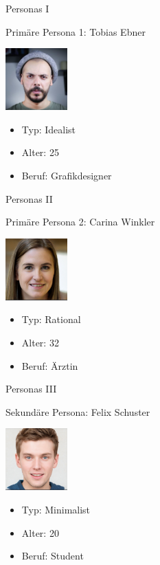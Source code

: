 \documentclass[presentation,bigger,aspectratio=169]{beamer}
\begin{document}
\begin{frame}[label={sec:org28a7227}]{Personas I}
\begin{block}{Primäre Persona 1: Tobias Ebner}
\begin{center}
\includegraphics[width=90px]{./img/m1_persona_1_idealist.png}
\end{center}
\begin{itemize}
\item Typ: Idealist
\item Alter: 25
\item Beruf: Grafikdesigner
\end{itemize}
\end{block}
\end{frame}
\begin{frame}[label={sec:orgfadc1d1}]{Personas II}
\begin{block}{Primäre Persona 2: Carina Winkler}
\begin{center}
\includegraphics[width=90px]{./img/m1_persona_2_rational.png}
\end{center}
\begin{itemize}
\item Typ: Rational
\item Alter: 32
\item Beruf: Ärztin
\end{itemize}
\end{block}
\end{frame}
\begin{frame}[label={sec:org68bc9e1}]{Personas III}
\begin{block}{Sekundäre Persona: Felix Schuster}
\begin{center}
\includegraphics[width=90px]{./img/m1_persona_3_rational.png}
\end{center}
\begin{itemize}
\item Typ: Minimalist
\item Alter: 20
\item Beruf: Student
\end{itemize}
\end{block}
\end{frame}
\end{document}
